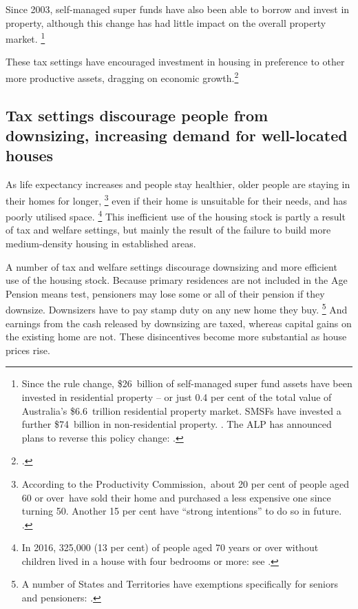 Since 2003, self-managed super funds have also been able to borrow and invest in property, although this change has had little impact on the overall property market.%
    \footnote{Since the rule change, \$26~billion of self-managed super fund assets have been invested in residential property -- or just 0.4 per cent of the total value of Australia's \$6.6~trillion residential property market.
	SMSFs have invested a further \$74~billion in non-residential property.
	\textcites[][13]{RBA2015SubmissionHomeOwnershipInquiry}[][Asset allocation tables]{ATO-2016-Asset-allocation-tables}.
	The ALP has announced plans to reverse this policy change: \textcite{Coorey2017-AFR-housing}.}

These tax settings have encouraged investment in housing in preference to other more productive assets, dragging on economic growth.\footnote{\textcite[][15--16]{DaleyWood2016-Negative-Gearing-CGT}.}

\subsection{Tax settings discourage people from downsizing, increasing demand for well-located houses}\label{subsec:tax-settings-discourage-people-from-downsizing-increasing-demand-for-well-located-houses}

As life expectancy increases and people stay healthier, older people are staying in their homes for longer,%
	\footnote{According to the Productivity Commission,~about 20 per cent of people aged 60 or over~have sold their home and purchased a less expensive one since turning 50.
	Another 15 per cent have ``strong intentions'' to do so in future. \textcite{PC-2015-Housing-decisions-elderly}.}
even if their home is unsuitable for their needs, and has poorly utilised space.%
	\footnote{In 2016, 325,000 (13 per cent) of people aged 70 years or over without children lived in a house with four bedrooms or more: see .}
This inefficient use of the housing stock is partly a result of tax and welfare settings, but mainly the result of the failure to build more medium-density housing in established areas.

A number of tax and welfare settings discourage downsizing and more efficient use of the housing stock.
Because primary residences are not included in the Age Pension means test, pensioners may lose some or all of their pension if they downsize.
Downsizers have to pay stamp duty on any new home they buy.%
    \footnote{A number of States and Territories have exemptions specifically for seniors and pensioners: \textcite[][137]{PC-2015-Housing-decisions-elderly}.}
And earnings from the cash released by downsizing are taxed, whereas capital gains on the existing home are not.
These disincentives become more substantial as house prices rise.

